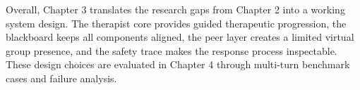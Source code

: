 Overall, Chapter 3 translates the research gaps from Chapter 2 into a working system design. The therapist core provides guided therapeutic progression, the blackboard keeps all components aligned, the peer layer creates a limited virtual group presence, and the safety trace makes the response process inspectable. These design choices are evaluated in Chapter 4 through multi-turn benchmark cases and failure analysis.
